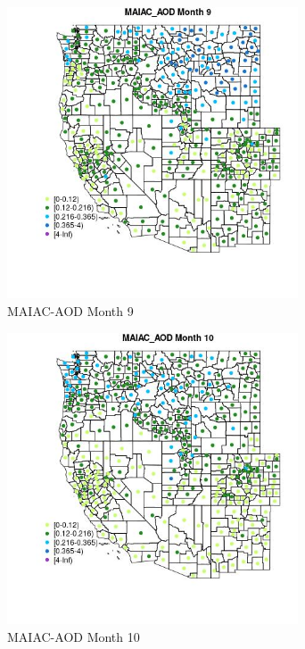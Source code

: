 \begin{figure} 
\centering  
\includegraphics[width=0.77\textwidth]{Code_Outputs/df_report_ML_predictors_CountyCentroid_Locations_Dates_2008-01-01to2018-12-31_MapObsMo9MAIAC_AOD.jpg} 
\caption{\label{fig:df_report_ML_predictors_CountyCentroid_Locations_Dates_2008-01-01to2018-12-31MapObsMo9MAIAC_AOD}MAIAC-AOD Month 9} 
\end{figure} 
 

\begin{figure} 
\centering  
\includegraphics[width=0.77\textwidth]{Code_Outputs/df_report_ML_predictors_CountyCentroid_Locations_Dates_2008-01-01to2018-12-31_MapObsMo10MAIAC_AOD.jpg} 
\caption{\label{fig:df_report_ML_predictors_CountyCentroid_Locations_Dates_2008-01-01to2018-12-31MapObsMo10MAIAC_AOD}MAIAC-AOD Month 10} 
\end{figure} 
 

